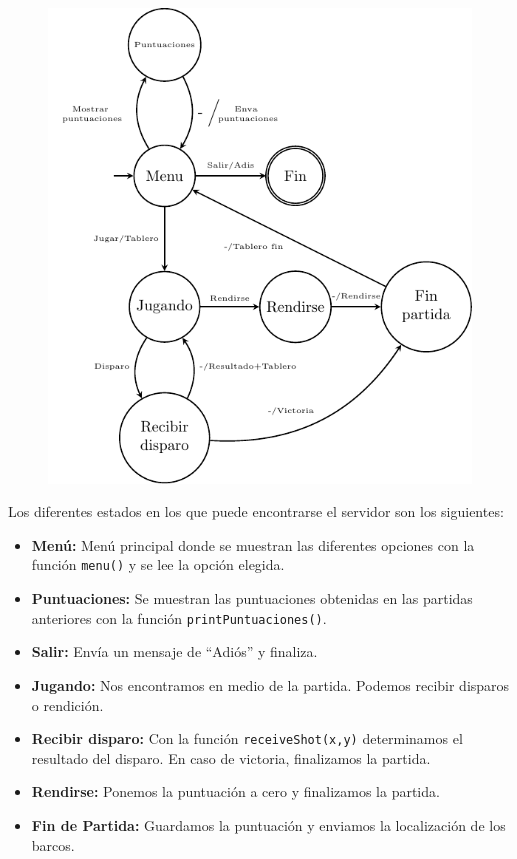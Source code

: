 \documentclass{article}
\begin{document}
\begin{figure}[H]
  \centering
  \includegraphics[width = 115mm]{estados_servidor}
\end{figure}

Los diferentes estados en los que puede encontrarse el servidor son los siguientes:

\begin{itemize}
\item \textbf{Menú:} Menú principal donde se muestran las diferentes opciones con la función \texttt{menu()} y se lee la opción elegida.
\item \textbf{Puntuaciones:} Se muestran las puntuaciones obtenidas en las partidas anteriores con la función \texttt{printPuntuaciones()}.
\item \textbf{Salir:} Envía un mensaje de ``Adiós'' y finaliza.
\item \textbf{Jugando:} Nos encontramos en medio de la partida. Podemos recibir disparos o rendición.
\item \textbf{Recibir disparo:} Con la función \texttt{receiveShot(x,y)} determinamos el resultado del disparo. En caso de victoria, finalizamos la partida.

\item \textbf{Rendirse:} Ponemos la puntuación a cero y finalizamos la partida.
\item \textbf{Fin de Partida:} Guardamos la puntuación y enviamos la localización de los barcos.
\end{itemize}
\end{document}

